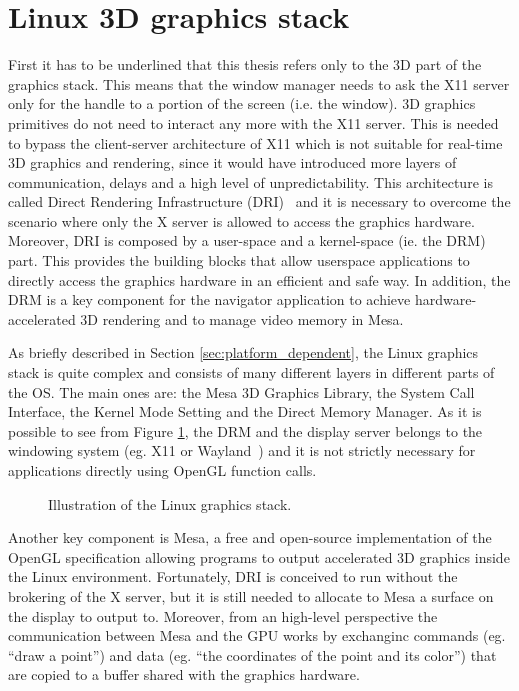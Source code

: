 \section{Linux 3D graphics stack}
First it has to be underlined that this thesis refers only to the 3D part of the
graphics stack. This means that the window manager needs to ask the X11 server
only for the handle to a portion of the screen (i.e. the window).
3D graphics primitives do not need to interact any more with the X11 server. This
is needed to bypass the client-server architecture of X11 which is not suitable for
real-time 3D graphics and rendering, since it would have introduced more layers
of communication, delays and a high level of unpredictability.
This architecture is called
Direct Rendering Infrastructure (DRI)~\cite{paul2000introduction} and it is
necessary to overcome the scenario where only the X server is allowed to access
the graphics hardware. Moreover, DRI is composed by a user-space and a kernel-space
(ie. the DRM) part. This provides the building blocks that allow userspace applications
to directly access the graphics hardware in an efficient and safe way.
In addition, the DRM is a key component for the navigator application to achieve
hardware-accelerated 3D rendering and to manage video memory in Mesa.

As briefly described in Section \ref{sec:platform_dependent}, the Linux graphics
stack is quite complex and consists of many different layers in different parts
of the OS. The main ones are: the Mesa 3D Graphics Library, the System Call
Interface, the Kernel Mode Setting and the Direct Memory Manager.
As it is possible to see from Figure \ref{img:linux_graphics_stack}, the DRM and 
the display server belongs to the windowing system (eg. X11 or Wayland~\cite{wayland}) 
and it is not strictly necessary for applications directly using OpenGL function
calls.
\begin{figure}[!htb]\label{img:linux_graphics_stack}
    \caption{Illustration of the Linux graphics stack.}
\end{figure} 

Another key component is Mesa, a free and open-source implementation of the
OpenGL specification allowing
programs to output accelerated 3D graphics inside the Linux environment. Fortunately,
DRI is conceived to run without the brokering of the X server, but it is still
needed to allocate to Mesa a surface on the display to output to. Moreover, from
an high-level perspective the communication between Mesa and the GPU works by
exchanginc commands (eg. ``draw a point'') and data (eg. ``the coordinates of the
point and its color'') that are copied to a buffer shared with the graphics hardware.


